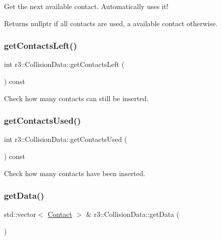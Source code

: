 Get the next available contact. Automatically uses it! \begin{DoxyReturn}{Returns}
nullptr if all contacts are used, a available contact otherwise. 
\end{DoxyReturn}
\mbox{\label{classr3_1_1_collision_data_a13e8ade4bbbbc63a1437de9371fea879}} 
\subsubsection{\texorpdfstring{get\+Contacts\+Left()}{getContactsLeft()}}
{\footnotesize\ttfamily int r3\+::\+Collision\+Data\+::get\+Contacts\+Left (\begin{DoxyParamCaption}{ }\end{DoxyParamCaption}) const}

Check how many contacts can still be inserted. \mbox{\label{classr3_1_1_collision_data_aaf0e65914133cd35cc32224df851561e}} 
\subsubsection{\texorpdfstring{get\+Contacts\+Used()}{getContactsUsed()}}
{\footnotesize\ttfamily int r3\+::\+Collision\+Data\+::get\+Contacts\+Used (\begin{DoxyParamCaption}{ }\end{DoxyParamCaption}) const}

Check how many contacts have been inserted. \mbox{\label{classr3_1_1_collision_data_acb1bb23e8d0f37f0ebc39e8f7642419f}} 
\subsubsection{\texorpdfstring{get\+Data()}{getData()}}
{\footnotesize\ttfamily std\+::vector$<$ \mbox{\hyperlink{classr3_1_1_contact}{Contact}} $>$ \& r3\+::\+Collision\+Data\+::get\+Data (\begin{DoxyParamCaption}{ }\end{DoxyParamCaption})}

